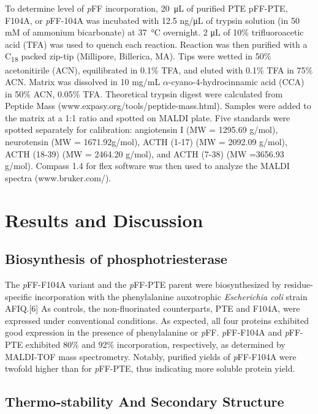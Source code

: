 \begin{refsection}
To determine level of \emph{p}FF incorporation, \SI{20}{\micro\liter} of
purified PTE pFF-PTE, F104A, or \emph{p}FF-104A was incubated with 12.5 ng/μL
of trypsin solution (in 50 mM of ammonium bicarbonate) at \SI{37}{\celsius}
overnight. 2 μL of 10\% trifluoroacetic acid (TFA) was used to quench each
reaction. Reaction was then purified with a C\textsubscript{18} packed zip-tip
(Millipore, Billerica, MA).  Tips were wetted in 50\% acetonitirile (ACN),
equilibrated in 0.1\% TFA, and eluted with 0.1\% TFA in 75\% ACN. Matrix was
dissolved in 10 mg/mL $\alpha$-cyano-4-hydrocinnamic acid (CCA) in 50\% ACN,
0.05\% TFA. Theoretical trypsin digest were calculated from Peptide Mass
(www.expasy.org/tools/peptide-mass.html). Samples were added to the matrix at a
1:1 ratio and spotted on MALDI plate. Five standards were spotted separately
for calibration: angiotensin I (MW = 1295.69 g/mol), neurotensin (MW =
1671.92g/mol), ACTH (1-17) (MW = 2092.09 g/mol), ACTH (18-39) (MW = 2464.20
g/mol), and ACTH (7-38) (MW =3656.93 g/mol). Compass 1.4 for flex software was
then used to analyze the MALDI spectra (www.bruker.com/).

\section{Results and Discussion}

\subsection{Biosynthesis of phosphotriesterase}

The \emph{p}FF-F104A variant and the \emph{p}FF-PTE parent were biosynthesized
by residue-specific incorporation with the phenylalanine auxotrophic
\emph{Escherichia coli} strain AFIQ.[6] As controls, the non-fluorinated
counterparts, PTE and F104A, were expressed under conventional conditions. As
expected, all four proteins exhibited good expression in the presence of
phenylalanine or \emph{p}FF. \emph{p}FF-F104A and \emph{p}FF-PTE exhibited 80\%
and 92\% incorporation, respectively, as determined by MALDI-TOF mass
spectrometry. Notably, purified yields of \emph{p}FF-F104A were twofold higher
than for \emph{p}FF-PTE, thus indicating more soluble protein yield.

\subsection{Thermo-stability And Secondary Structure}


\end{refsection}
